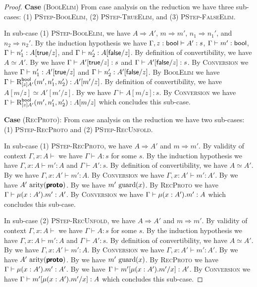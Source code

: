 \begin{proof}
\textbf{Case} (\textsc{BoolElim})
  From case analysis on the reduction we have three sub-cases:
  (1) \textsc{PStep-BoolElim}, (2) \textsc{PStep-TrueElim}, and (3) \textsc{PStep-FalseElim}.

  In sub-case (1) \textsc{PStep-BoolElim}, we have 
  $A \Rightarrow A'$, $m \Rightarrow m'$, $n_1 \Rightarrow n_1'$, and $n_2 \Rightarrow n_2'$.
  By the induction hypothesis we have
  $\Gamma, z : \textsf{bool} \vdash A' : s$, 
  $\Gamma \vdash m' : \textsf{bool}$, 
  $\Gamma \vdash n_1' : A[\textsf{true}/z]$, and 
  $\Gamma \vdash n_2' : A[\textsf{false}/z]$.
  By definition of convertibility, we have $A \simeq A'$.
  By  we have $\Gamma \vdash A'[\textsf{true}/z] : s$ and $\Gamma \vdash A'[\textsf{false}/z] : s$.
  By \textsc{Conversion} we have $\Gamma \vdash n_1' : A'[\textsf{true}/z]$ and $\Gamma \vdash n_2' : A'[\textsf{false}/z]$.
  By \textsc{BoolElim} we have $\Gamma \vdash \text{R}_{[z]A'}^{\textsf{bool}}({m'},{n_1'},{n_2'}) : A'[m'/z]$.
  By definition of convertibility, we have $A[m/z] \simeq A'[m'/z]$.
  By  we have $\Gamma \vdash A[m/z] : s$.
  By \textsc{Conversion} we have $\Gamma \vdash \text{R}_{[z]A'}^{\textsf{bool}}({m'},{n_1'},{n_2'}) : A[m/z]$ which concludes this sub-case.

\textbf{Case} (\textsc{RecProto}):
  From case analysis on the reduction we have two sub-cases:
  (1) \textsc{PStep-RecProto} and (2) \textsc{PStep-RecUnfold}.

  In sub-case (1) \textsc{PStep-RecProto}, we have $A \Rightarrow A'$ and $m \Rightarrow m'$.
  By validity of context $\Gamma, x : A \vdash$ we have $\Gamma \vdash A : s$ for some $s$.
  By the induction hypothesis we have ${\Gamma, x : A \vdash m' : A}$ and ${\Gamma \vdash A' : s}$.
  By definition of convertibility, we have $A \simeq A'$.
  By  we have $\Gamma, x : A' \vdash m' : A$.
  By \textsc{Conversion} we have $\Gamma, x : A' \vdash m' : A'$.
  By  we have $A'~\text{arity}(\textbf{\textsf{proto}})$.
  By  we have $m'~\text{guard}(x)$.
  By \textsc{RecProto} we have $\Gamma \vdash \mu({x : A'}).{m'} : A'$.
  By \textsc{Conversion} we have $\Gamma \vdash \mu({x : A'}).{m'} : A$ which concludes this sub-case.

  In sub-case (2) \textsc{PStep-RecUnfold}, we have $A \Rightarrow A'$ and $m \Rightarrow m'$.
  By validity of context $\Gamma, x : A \vdash$ we have $\Gamma \vdash A : s$ for some $s$.
  By the induction hypothesis we have ${\Gamma, x : A \vdash m' : A}$ and ${\Gamma \vdash A' : s}$.
  By definition of convertibility, we have $A \simeq A'$.
  By  we have $\Gamma, x : A' \vdash m' : A$.
  By \textsc{Conversion} we have $\Gamma, x : A' \vdash m' : A'$.
  By  we have $A'~\text{arity}(\textbf{\textsf{proto}})$.
  By  we have $m'~\text{guard}(x)$.
  By \textsc{RecProto} we have $\Gamma \vdash \mu({x : A'}).{m'} : A'$.
  By  we have $\Gamma \vdash m'[\mu({x : A'}).{m'}/x] : A'$.
  By \textsc{Conversion} we have $\Gamma \vdash m'[\mu({x : A'}).{m'}/x] : A$ which concludes this sub-case.
\end{proof}

